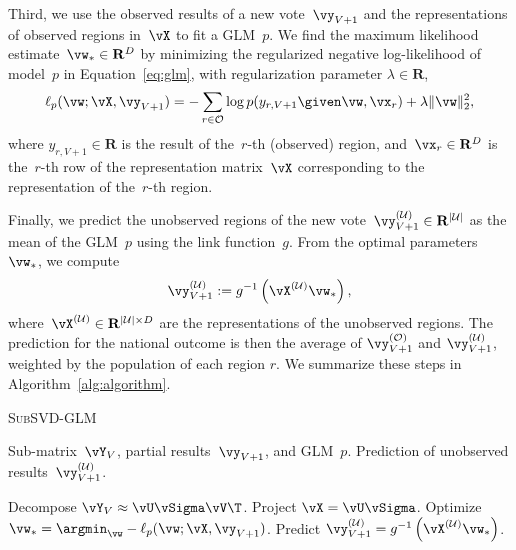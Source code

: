 Third, we use the observed results of a new vote~$\vy_{V+1}$ and the representations of observed regions in~$\vX$ to fit a GLM~$p$.
We find the maximum likelihood estimate~$\vw_* \in \mathbf{R}^D$ by minimizing the regularized negative log-likelihood of model~$p$ in Equation~\eqref{eq:glm}, with regularization parameter $\lambda \in \mathbf{R}$,
\begin{equation}
	\label{eq:log_likelihood}
	\ell_p(\vw ; \vX, \vy_{V+1}) = -\sum_{r \in \Obs} \log p(y_{r,V+1} \given \vw, \vx_r) + \lambda \| \vw \|_2^2,
\end{equation}
where $y_{r,V+1} \in \mathbf{R}$ is the result of the~$r$-th (observed) region, and~$\vx_r \in \mathbf{R}^D$ is the~$r$-th row of the representation matrix~$\vX$ corresponding to the representation of the~$r$-th region.

Finally, we predict the unobserved regions of the new vote~$\vy_{V+1}^{(\Ubs)} \in \mathbf{R}^{\vert \Ubs \vert}$ as the mean of the GLM~$p$ using the link function~$g$.
From the optimal parameters~$\vw_*$, we compute
\begin{equation}
	\label{eq:prediction}
	\vy^{(\Ubs)}_{V+1} := g^{-1}\left(\vX^{(\Ubs)} \vw_*\right),
\end{equation}
where~$\vX^{(\Ubs)} \in \mathbf{R}^{\vert \Ubs \vert \times D}$ are the representations of the unobserved regions.
The prediction for the national outcome is then the average of $\vy_{V+1}^{(\Obs)}$ and $\vy_{V+1}^{(\Ubs)}$, weighted by the population of each region $r$.
We summarize these steps in Algorithm~\ref{alg:algorithm}.

\begin{algorithm}
	\caption{\textsc{SubSVD-GLM}}
	\label{alg:algorithm}
	\begin{algorithmic}[1]
		\Input Sub-matrix~$\vY_V$, partial results~$\vy_{V+1}$, and GLM~$p$.
		\Output Prediction of unobserved results~$\vy_{V+1}^{(\Ubs)}$.

		\State Decompose $\vY_V \approx \vU \vSigma \vV\T$. 
		\State Project $\vX = \vU \vSigma$. 
		\State Optimize $\vw_* = \argmin_{\vw} -\ell_p(\vw ; \vX, \vy_{V+1})$. 
		\State Predict $\vy^{(\Ubs)}_{V+1} = g^{-1}\left(\vX^{(\Ubs)} \vw_*\right)$. 

	\end{algorithmic}
\end{algorithm}

